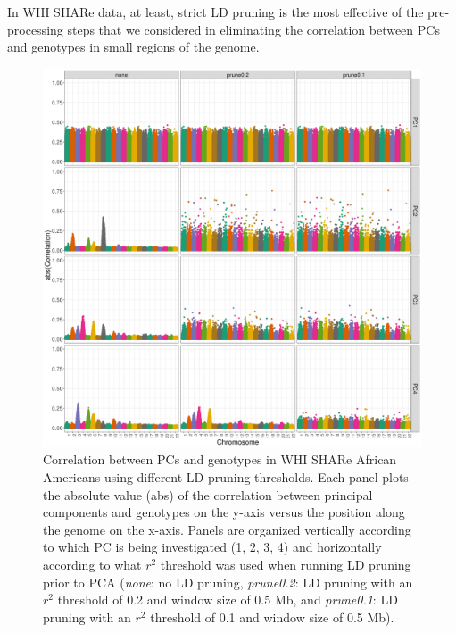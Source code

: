 \documentclass[12pt]{article}
\begin{document}
In WHI SHARe data, at least, strict LD pruning is the most effective of the pre-processing steps that we considered in eliminating the correlation between PCs and genotypes in small regions of the genome.

\begin{figure}
\center
\includegraphics[width=\textwidth]{figs/pc_geno_corr/pc_geno_corr_compare_prune}
\caption[Correlation between PCs and genotypes using different LD pruning thresholds.]{Correlation between PCs and genotypes in WHI SHARe African Americans using different LD pruning thresholds. Each panel plots the absolute value (abs) of the correlation between principal components and genotypes on the y-axis versus the position along the genome on the x-axis.  Panels are organized vertically according to which PC is being investigated (1, 2, 3, 4) and horizontally according to what $r^2$ threshold was used when running LD pruning prior to PCA (\textit{none}: no LD pruning, \textit{prune0.2}: LD pruning with an $r^2$ threshold of 0.2 and window size of 0.5 Mb, and \textit{prune0.1}: LD pruning with an $r^2$ threshold of 0.1 and window size of 0.5 Mb).}
\label{fig:corr-compare-prune}
\end{figure}
\end{document}
